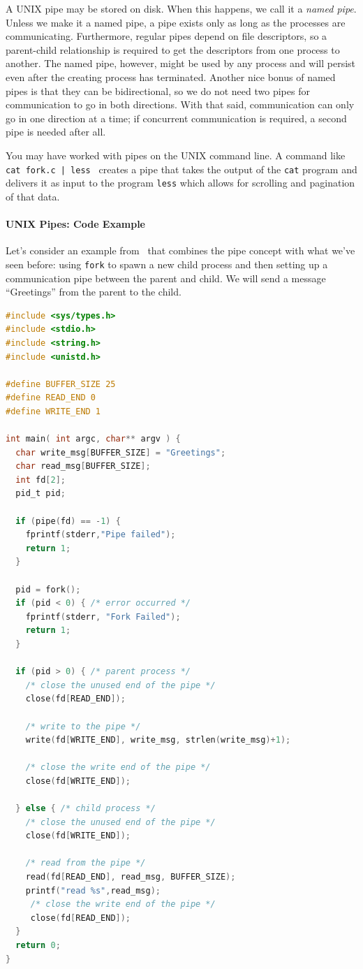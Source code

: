 A UNIX pipe may be stored on disk. When this happens, we call it a \textit{named pipe}. Unless we make it a named pipe, a pipe exists only as long as the processes are communicating. Furthermore, regular pipes depend on file descriptors, so a parent-child relationship is required to get the descriptors from one process to another. The named pipe, however, might be used by any process and will persist even after the creating process has terminated. Another nice bonus of named pipes is that they can be bidirectional, so we do not need two pipes for communication to go in both directions. With that said, communication can only go in one direction at a time; if concurrent communication is required, a second pipe is needed after all.

You may have worked with pipes on the UNIX command line. A command like \texttt{ cat fork.c | less } creates a pipe that takes the output of the \texttt{cat} program and delivers it as input to the program \texttt{less} which allows for scrolling and pagination of that data.

\paragraph{UNIX Pipes: Code Example}

Let's consider an example from~\cite{osc} that combines the pipe concept with what we've seen before: using \texttt{fork} to spawn a new child process and then setting up a communication pipe between the parent and child. We will send a message ``Greetings'' from the parent to the child.

\begin{lstlisting}[language=C]
#include <sys/types.h> 
#include <stdio.h> 
#include <string.h> 
#include <unistd.h>

#define BUFFER_SIZE 25
#define READ_END 0 
#define WRITE_END 1

int main( int argc, char** argv ) {
  char write_msg[BUFFER_SIZE] = "Greetings"; 
  char read_msg[BUFFER_SIZE];
  int fd[2];
  pid_t pid;

  if (pipe(fd) == -1) {
    fprintf(stderr,"Pipe failed");
    return 1;
  }
  
  pid = fork();
  if (pid < 0) { /* error occurred */ 
    fprintf(stderr, "Fork Failed"); 
    return 1;
  }

  if (pid > 0) { /* parent process */
    /* close the unused end of the pipe */ 
    close(fd[READ_END]);
    
    /* write to the pipe */
    write(fd[WRITE_END], write_msg, strlen(write_msg)+1);
    
    /* close the write end of the pipe */
    close(fd[WRITE_END]);
    
  } else { /* child process */
    /* close the unused end of the pipe */ 
    close(fd[WRITE_END]);
    
    /* read from the pipe */
    read(fd[READ_END], read_msg, BUFFER_SIZE); 
    printf("read %s",read_msg);
     /* close the write end of the pipe */
     close(fd[READ_END]);
  }
  return 0;
}
\end{lstlisting}


